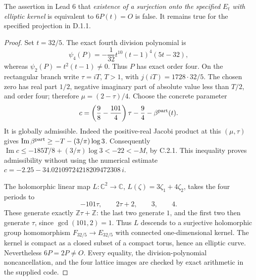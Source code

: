 \begin{theorem}[counterexample]\label{fam:src:D.1.3}\label{fam:st:D.1.3}
The assertion in Lead 6 that \emph{existence of a surjection onto the
specified \(E_t\) with elliptic kernel} is equivalent to \(6P(t)=O\)
is false. It remains true for the specified projection in D.1.1.
\end{theorem}
\begin{proof}
Set \(t=32/5\). The exact fourth division polynomial is
\[
 \psi_4(P)=-\frac1{32}t^{10}(t-1)^4(5t-32),
\]
whereas \(\psi_2(P)=t^2(t-1)\ne0\). Thus \(P\) has exact order four.
On the rectangular branch write \(\tau=iT\), \(T>1\), with
\(j(iT)=1728\cdot32/5\). The chosen zero has real part \(1/2\), negative
imaginary part of absolute value less than \(T/2\), and order four;
therefore \(\mu=(2-\tau)/4\). Choose the concrete parameter
\[
 c=\left(\frac98-\frac{101}{4}\right)\tau-\frac94
       -\beta^{\rm part}(t).
\]
It is globally admissible. Indeed the positive-real Jacobi product at this
\((\mu,\tau)\) gives
\(\operatorname{Im}\beta^{\rm part}\geq-T-(3/\pi)\log3\).
Consequently
\(\operatorname{Im}c\leq-185T/8+(3/\pi)\log3<-22<-M\), by C.2.1.
This inequality proves admissibility without using the numerical estimate
\(c=-2.25-34.02109724218209472308\,i\).

The holomorphic linear map \(L:\mathbb C^2\to\mathbb C\),
\(L(\zeta)=3\zeta_1+4\zeta_2\), takes the four periods to
\[
 -101\tau,\qquad2\tau+2,\qquad3,\qquad4.
\]
These generate exactly \(\mathbb Z\tau+\mathbb Z\): the last two generate
\(1\), and the first two then generate \(\tau\), since
\(\gcd(101,2)=1\). Thus \(L\) descends to a surjective holomorphic group
homomorphism \(F_{32/5}\to E_{32/5}\) with connected one-dimensional
kernel. The kernel is compact as a closed subset of a compact torus,
hence an elliptic curve. Nevertheless \(6P=2P\ne O\).
Every equality, the division-polynomial noncancellation, and the four
lattice images are checked by exact arithmetic in the supplied code.
\end{proof}

